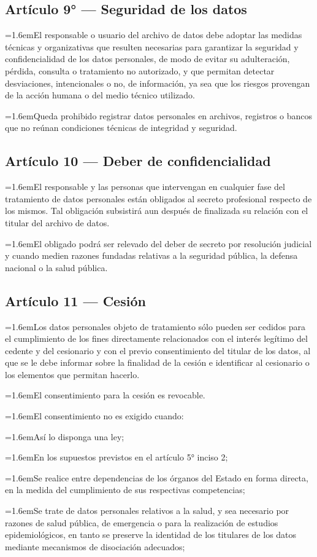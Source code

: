 \documentclass[10pt,a4paper]{article}
\newcommand{\articulo}[1]{\subsection{#1}}
\newcommand{\inciso}[2]{\par{\hangindent=1.6em\hangafter=1\makebox[1.6em][l]{#1}#2\par}}
\begin{document}
\articulo{Artículo 9° --- Seguridad de los datos}
\inciso{1.}{El responsable o usuario del archivo de datos debe adoptar las medidas técnicas y organizativas que resulten necesarias para garantizar la seguridad y confidencialidad de los datos personales, de modo de evitar su adulteración, pérdida, consulta o tratamiento no autorizado, y que permitan detectar desviaciones, intencionales o no, de información, ya sea que los riesgos provengan de la acción humana o del medio técnico utilizado.}

\inciso{2.}{Queda prohibido registrar datos personales en archivos, registros o bancos que no reúnan condiciones técnicas de integridad y seguridad.}

\articulo{Artículo 10 --- Deber de confidencialidad}
\inciso{1.}{El responsable y las personas que intervengan en cualquier fase del tratamiento de datos personales están obligados al secreto profesional respecto de los mismos. Tal obligación subsistirá aun después de finalizada su relación con el titular del archivo de datos.}

\inciso{2.}{El obligado podrá ser relevado del deber de secreto por resolución judicial y cuando medien razones fundadas relativas a la seguridad pública, la defensa nacional o la salud pública.}

\articulo{Artículo 11 --- Cesión}
\inciso{1.}{Los datos personales objeto de tratamiento sólo pueden ser cedidos para el cumplimiento de los fines directamente relacionados con el interés legítimo del cedente y del cesionario y con el previo consentimiento del titular de los datos, al que se le debe informar sobre la finalidad de la cesión e identificar al cesionario o los elementos que permitan hacerlo.}

\inciso{2.}{El consentimiento para la cesión es revocable.}

\inciso{3.}{El consentimiento no es exigido cuando:}

\inciso{a)}{Así lo disponga una ley;}

\inciso{b)}{En los supuestos previstos en el artículo 5° inciso 2;}

\inciso{c)}{Se realice entre dependencias de los órganos del Estado en forma directa, en la medida del cumplimiento de sus respectivas competencias;}

\inciso{d)}{Se trate de datos personales relativos a la salud, y sea necesario por razones de salud pública, de emergencia o para la realización de estudios epidemiológicos, en tanto se preserve la identidad de los titulares de los datos mediante mecanismos de disociación adecuados;}
\end{document}

